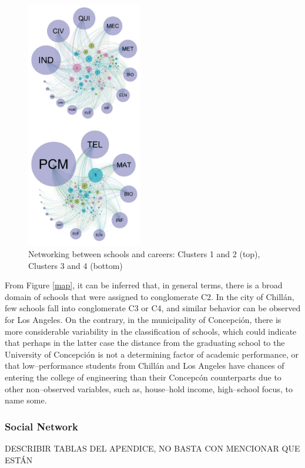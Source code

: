 \documentclass[5p,authoryear,preprint,12pt]{elsarticle}
\begin{document}
\begin{figure}[htb!] 
	\centering
	\includegraphics[width=0.45\textwidth]{standalone_network}
	\caption{Networking between schools and careers: Clusters 1 and 2 (top), Clusters 3 and 4 (bottom)}
	\label{network}
\end{figure}

From Figure \ref{map}, it can be inferred that, in general terms, there is a broad domain of schools that were assigned to conglomerate C2. In the city of Chillán, few schools fall into conglomerate C3 or C4, and similar behavior can be observed for Los Angeles. On the contrary, in the municipality of Concepción, there is more considerable variability in the classification of schools, which could indicate that perhaps in the latter case the distance from the graduating school to the University of Concepción is not a determining factor of academic performance, or that low--performance students from Chill\'an and Los Angeles have chances of entering the college of engineering than their Concepc\'on counterparts due to other non--observed variables, such as, house--hold income, high--school focus, to name some.

\subsubsection{Social Network}
DESCRIBIR TABLAS DEL APENDICE, NO BASTA CON MENCIONAR QUE ESTÁN
\end{document}

